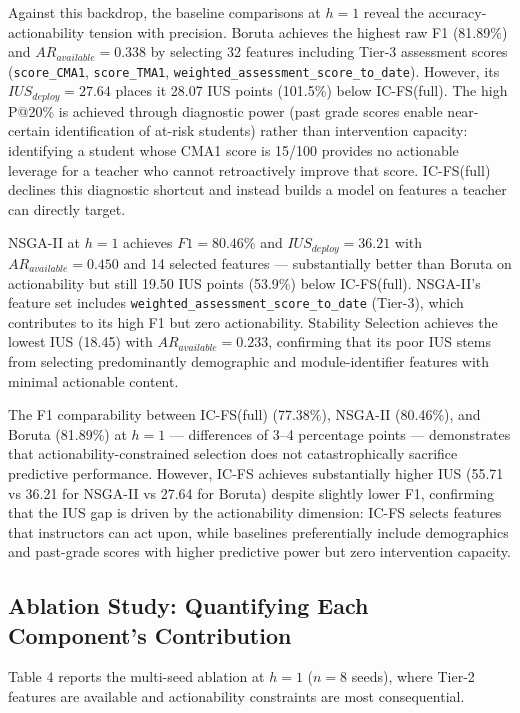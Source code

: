 \documentclass[a4paper,fleqn]{cas-sc}
\begin{document}
Against this backdrop, the baseline comparisons at $h=1$ reveal the accuracy-actionability tension with precision. Boruta achieves the highest raw F1 (81.89\%) and $AR_{available} = 0.338$ by selecting 32 features including Tier-3 assessment scores (\texttt{score\_CMA1}, \texttt{score\_TMA1}, \texttt{weighted\_assessment\_score\_to\_date}). However, its $IUS_{deploy} = 27.64$ places it 28.07 IUS points (101.5\%) below IC-FS(full). The high P@20\% is achieved through diagnostic power (past grade scores enable near-certain identification of at-risk students) rather than intervention capacity: identifying a student whose CMA1 score is 15/100 provides no actionable leverage for a teacher who cannot retroactively improve that score. IC-FS(full) declines this diagnostic shortcut and instead builds a model on features a teacher can directly target.

NSGA-II at $h=1$ achieves $F1 = 80.46\%$ and $IUS_{deploy} = 36.21$ with $AR_{available} = 0.450$ and 14 selected features --- substantially better than Boruta on actionability but still 19.50 IUS points (53.9\%) below IC-FS(full). NSGA-II's feature set includes \texttt{weighted\_assessment\_score\_to\_date} (Tier-3), which contributes to its high F1 but zero actionability. Stability Selection achieves the lowest IUS (18.45) with $AR_{available} = 0.233$, confirming that its poor IUS stems from selecting predominantly demographic and module-identifier features with minimal actionable content.

The F1 comparability between IC-FS(full) (77.38\%), NSGA-II (80.46\%), and Boruta (81.89\%) at $h=1$ --- differences of 3--4 percentage points --- demonstrates that actionability-constrained selection does not catastrophically sacrifice predictive performance. However, IC-FS achieves substantially higher IUS (55.71 vs 36.21 for NSGA-II vs 27.64 for Boruta) despite slightly lower F1, confirming that the IUS gap is driven by the actionability dimension: IC-FS selects features that instructors can act upon, while baselines preferentially include demographics and past-grade scores with higher predictive power but zero intervention capacity.

\subsection{Ablation Study: Quantifying Each Component's Contribution}

Table 4 reports the multi-seed ablation at $h=1$ ($n=8$ seeds), where Tier-2 features are available and actionability constraints are most consequential.
\end{document}
